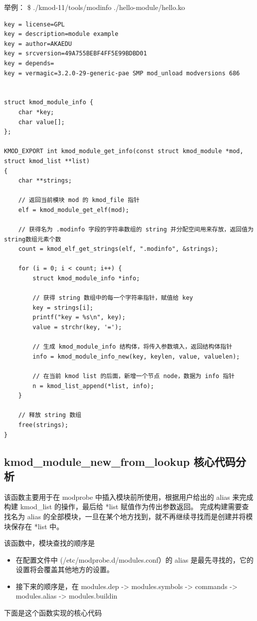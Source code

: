 举例： \$ ./kmod-11/tools/modinfo ./hello-module/hello.ko

{\begin{shaded}\begin{verbatim}
key = license=GPL
key = description=module example 
key = author=AKAEDU
key = srcversion=49A755BEBF4FF5E99BDBD01
key = depends=
key = vermagic=3.2.0-29-generic-pae SMP mod_unload modversions 686 


struct kmod_module_info {
    char *key;
    char value[];
};

KMOD_EXPORT int kmod_module_get_info(const struct kmod_module *mod, struct kmod_list **list)
{
    char **strings;

    // 返回当前模块 mod 的 kmod_file 指针
    elf = kmod_module_get_elf(mod);

    // 获得名为 .modinfo 字段的字符串数组的 string 并分配空间用来存放，返回值为string数组元素个数
    count = kmod_elf_get_strings(elf, ".modinfo", &strings);

    for (i = 0; i < count; i++) {
        struct kmod_module_info *info;

        // 获得 string 数组中的每一个字符串指针，赋值给 key
        key = strings[i];
        printf("key = %s\n", key);
        value = strchr(key, '=');

        // 生成 kmod_module_info 结构体，将传入参数填入，返回结构体指针
        info = kmod_module_info_new(key, keylen, value, valuelen);

        // 在当前 kmod list 的后面，新增一个节点 node，数据为 info 指针
        n = kmod_list_append(*list, info);  
    }

    // 释放 string 数组
    free(strings);
}
\end{verbatim}\end{shaded}}
\subsection{kmod\_module\_new\_from\_lookup 核心代码分析}

该函数主要用于在 modprobe 中插入模块前所使用，根据用户给出的 alias
来完成构建 kmod\_list 的操作，最后给 *list 赋值作为传出参数返回。
完成构建需要查找名为 alias
的全部模块，一旦在某个地方找到，就不再继续寻找而是创建并将模块保存在 *list
中。

该函数中，模块查找的顺序是

\begin{itemize}
\item
  在配置文件中 (/etc/modprobe.d/modules.conf）的 alias
  是最先寻找的，它的设置将会覆盖其他地方的设置。
\item
  接下来的顺序是，在 modules.dep -\textgreater{} modules.symbols
  -\textgreater{} commands -\textgreater{} modules.alias -\textgreater{}
  modules.buildin
\end{itemize}
下面是这个函数实现的核心代码

